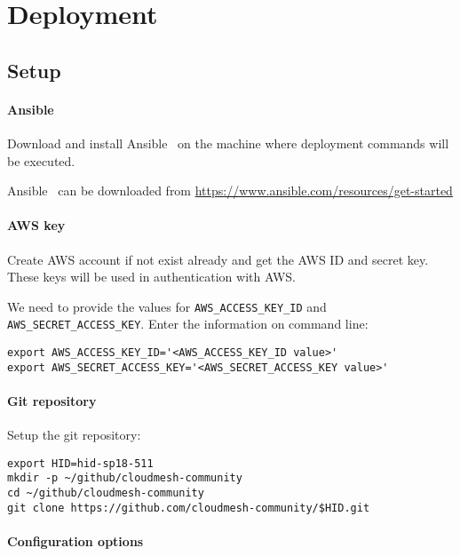 \section{Deployment}

\subsection{Setup}

\paragraph{Ansible}
Download and install Ansible~\cite{hid-sp18-511-www-ansible} on the
machine where deployment commands will be executed.

Ansible~\cite{hid-sp18-511-www-ansible} can be downloaded from
\url{https://www.ansible.com/resources/get-started}

\paragraph{AWS key}

Create AWS account if not exist already and get the AWS ID and secret
key. These keys will be used in authentication with AWS.

We need to provide the values for \verb|AWS_ACCESS_KEY_ID|
and \verb|AWS_SECRET_ACCESS_KEY|. Enter the information on command line:

\begin{verbatim}
export AWS_ACCESS_KEY_ID='<AWS_ACCESS_KEY_ID value>'
export AWS_SECRET_ACCESS_KEY='<AWS_SECRET_ACCESS_KEY value>'
\end{verbatim}

\paragraph{Git repository}

Setup the git repository:

\begin{verbatim}
export HID=hid-sp18-511
mkdir -p ~/github/cloudmesh-community
cd ~/github/cloudmesh-community
git clone https://github.com/cloudmesh-community/$HID.git
\end{verbatim}


\paragraph{Configuration options}

